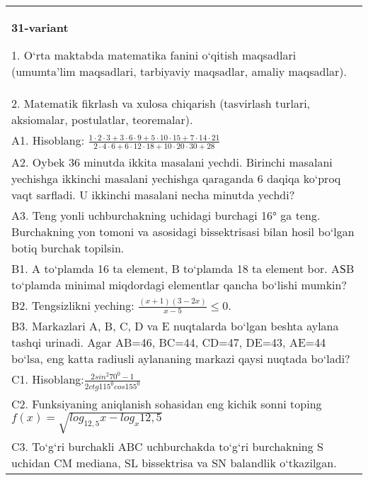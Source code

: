 \documentclass{article}
\begin{document}
\begin{tabular}{m{17cm}}
\textbf{31-variant}

1. O‘rta maktabda matematika fanini o‘qitish maqsadlari (umumta’lim maqsadlari, tarbiyaviy maqsadlar, amaliy maqsadlar). \\
2. Matematik fikrlash va xulosa chiqarish (tasvirlash turlari, aksiomalar, postulatlar, teoremalar). \\
A1. Hisoblang: \(\frac{1 \cdot 2 \cdot 3 + 3 \cdot 6 \cdot 9 + 5 \cdot 10 \cdot 15 + 7 \cdot 14 \cdot 21}{2 \cdot 4 \cdot 6 + 6 \cdot 12 \cdot 18 + 10 \cdot 20 \cdot 30 + 28}\) \\
A2. Oybek 36 minutda ikkita masalani yechdi. Birinchi masalani yechishga ikkinchi masalani yechishga qaraganda 6 daqiqa ko‘proq vaqt sarfladi. U ikkinchi masalani necha minutda yechdi? \\
A3. Teng yonli uchburchakning uchidagi burchagi 16° ga teng. Burchakning yon tomoni va asosidagi bissektrisasi bilan hosil bo‘lgan botiq burchak topilsin. \\
B1. A to‘plamda 16 ta element, B to‘plamda 18 ta element bor. AЅB to‘plamda minimal miqdordagi elementlar qancha bo‘lishi mumkin? \\
B2. Tengsizlikni yeching: \(\frac{ (x + 1) (3 - 2x) }{x - 5} \leq 0\). \\
B3. Markazlari A, B, C, D va E nuqtalarda bo‘lgan beshta aylana tashqi urinadi. Agar AB=46, BC=44, CD=47, DE=43, AE=44 bo‘lsa, eng katta radiusli aylananing markazi qaysi nuqtada bo‘ladi? \\
C1. Hisoblang:\(\frac{2sin^{2}70^{0} - 1}{2ctg115^{0}cos155^{0}}\) \\
C2. Funksiyaning aniqlanish sohasidan eng kichik sonni toping \(f (x) = \sqrt{log_{12,5}x - log_{x}12,5}\) \\
C3. To‘g‘ri burchakli ABC uchburchakda to‘g‘ri burchakning S uchidan CM mediana, SL bissektrisa va SN balandlik o‘tkazilgan. \\

\end{tabular}
\vspace{1cm}
\end{document}
